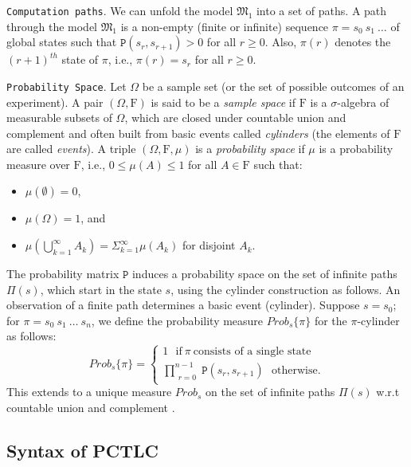 \vspace{0.2cm} \noindent \texttt{Computation paths}. We can unfold
the model $\mathfrak{M_1}$ into a set of paths. A path through the
model $\mathfrak{M_1}$ is a non-empty (finite or infinite) sequence
$\pi=s_0~s_1~\ldots$ of global states such that
$\texttt{P}(s_r, s_{r+1})> 0$ for all $r \geq 0$. Also,
$\pi(r)$ denotes the $(r+1)^{th}$ state of $\pi$, i.e.,
$\pi(r)=s_r$ for all $r \geq 0$.

\noindent \texttt{Probability Space}. Let $\Omega$ be a sample set
(or the set of possible outcomes of an experiment). A pair
$(\Omega,\mathrm{F})$ is said to be a \textit{sample space} if
$\mathrm{F}$ is a $\sigma$-algebra of measurable subsets of
$\Omega$, which are closed under countable union and complement
and often built from basic events called \textit{cylinders} (the
elements of $\mathrm{F}$ are called \textit{events}). A triple
$(\Omega,\mathrm{F},\mu)$ is a \textit{probability space} if
$\mu$ is a probability measure over $\mathrm{F}$, i.e., $0\leq\mu
(A)\leq 1$ for all $A\in \mathrm{F}$ such that:
%
\begin{itemize}
\item $\mu(\emptyset)=0$,
\item $\mu(\Omega) = 1$, and
\item $\mu(\bigcup_{k=1}^{\infty}A_k)=\Sigma_{k=1}^\infty \mu(A_k)$ for disjoint $A_k$.
\end{itemize}


The probability matrix $\texttt{P}$ induces a probability
space on the set of infinite paths $\Pi(s)$, which start in the
state $s$, using the cylinder construction \cite{Baier2008} as
follows. An observation of a finite path determines a basic event
(cylinder). Suppose $s = s_0$; for $\pi=s_0~s_1~\ldots~s_n$, we
define the probability measure $Prob_s \{\pi\}$ %
for the $\pi$-cylinder as follows:
%
\begin{equation}
Prob_s \{\pi\}=
\begin{cases} 1~~~\textrm{if}~\pi~\textrm{consists~of~a~single~state}\\
{\prod_{\substack{r=0}}^{n-1} \texttt{P}(s_r,s_{r+1})~~~\textrm{otherwise.}}
 \end{cases}
\end{equation}
%
\noindent This extends to a unique measure $Prob_s$ on the set of
infinite paths $\Pi(s)$ w.r.t countable union and complement
\cite{Kwiatkowska2007}.


\subsection{Syntax of PCTLC} \label{sec:syntax-PCTLKC}


